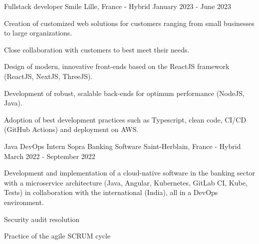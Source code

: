 \begin{cventries}
  \cventry
    {Fullstack developer} %
    {Smile} %
    {Lille, France - Hybrid} %
    {January 2023 - June 2023} %
    {
      \begin{cvitems} %
        \item {Creation of customized web solutions for customers ranging from small businesses to large organizations.}
        \item {Close collaboration with customers to best meet their needs.}
        \item {Design of modern, innovative front-ends based on the ReactJS framework (ReactJS, NextJS, ThreeJS).}
        \item {Development of robust, scalable back-ends for optimum performance (NodeJS, Java).}
        \item {Adoption of best development practices such as Typescript, clean code, CI/CD (GitHub Actions) and deployment on AWS.}
      \end{cvitems}
    }


  \cventry
    {Java DevOps Intern} %
    {Sopra Banking Software} %
    {Saint-Herblain, France - Hybrid} %
    {March 2022 - September 2022} %
    {
      \begin{cvitems} %
        \item {Development and implementation of a cloud-native software in the banking sector with a microservice architecture (Java, Angular, Kubernetes, GitLab CI, Kube, Tests) in collaboration with the international (India), all in a DevOps environment.}
        \item {Security audit resolution}
        \item {Practice of the agile SCRUM cycle}
      \end{cvitems}
    }
    

\end{cventries}
